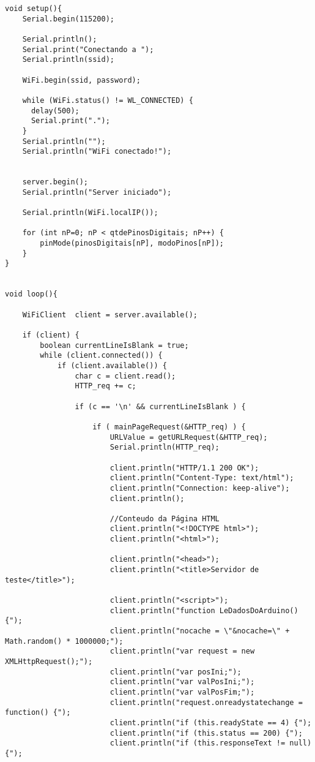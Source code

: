 \begin{lstlisting}
void setup(){
    Serial.begin(115200);

    Serial.println();
    Serial.print("Conectando a ");
    Serial.println(ssid);

    WiFi.begin(ssid, password);

    while (WiFi.status() != WL_CONNECTED) {
      delay(500);
      Serial.print(".");
    }
    Serial.println("");
    Serial.println("WiFi conectado!");


    server.begin();
    Serial.println("Server iniciado");

    Serial.println(WiFi.localIP());
    
    for (int nP=0; nP < qtdePinosDigitais; nP++) {
        pinMode(pinosDigitais[nP], modoPinos[nP]);
    }
}


void loop(){

    WiFiClient  client = server.available();

    if (client) { 
        boolean currentLineIsBlank = true;
        while (client.connected()) {
            if (client.available()) { 
                char c = client.read(); 
                HTTP_req += c;  
                
                if (c == '\n' && currentLineIsBlank ) { 

                    if ( mainPageRequest(&HTTP_req) ) {
                        URLValue = getURLRequest(&HTTP_req);
                        Serial.println(HTTP_req);
                                                 
                        client.println("HTTP/1.1 200 OK");
                        client.println("Content-Type: text/html");
                        client.println("Connection: keep-alive");              
                        client.println();
                        
                        //Conteudo da Página HTML
                        client.println("<!DOCTYPE html>");
                        client.println("<html>");

                        client.println("<head>");
                        client.println("<title>Servidor de teste</title>");

                        client.println("<script>");
                        client.println("function LeDadosDoArduino() {");
                        client.println("nocache = \"&nocache=\" + Math.random() * 1000000;");
                        client.println("var request = new XMLHttpRequest();");
                        client.println("var posIni;");
                        client.println("var valPosIni;");
                        client.println("var valPosFim;");
                        client.println("request.onreadystatechange = function() {");
                        client.println("if (this.readyState == 4) {");
                        client.println("if (this.status == 200) {");
                        client.println("if (this.responseText != null) {");


\end{lstlisting}
